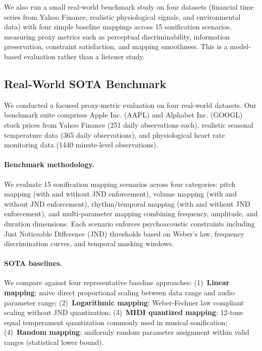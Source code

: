 \documentclass[sigchi, nonacm]{acmart}
\begin{document}
We also run a small real-world benchmark study on four datasets (financial time series from Yahoo Finance, realistic physiological signals, and environmental data) with four simple baseline mappings across 15 sonification scenarios, measuring proxy metrics such as perceptual discriminability, information preservation, constraint satisfaction, and mapping smoothness. This is a model-based evaluation rather than a listener study.

\subsection{Real-World SOTA Benchmark}
\label{sec:sota_benchmark}

We conducted a focused proxy-metric evaluation on four real-world datasets. Our benchmark suite comprises Apple Inc. (AAPL) and Alphabet Inc. (GOOGL) stock prices from Yahoo Finance (251 daily observations each), realistic seasonal temperature data (365 daily observations), and physiological heart rate monitoring data (1440 minute-level observations).

\paragraph{Benchmark methodology.} We evaluate 15 sonification mapping scenarios across four categories: pitch mapping (with and without JND enforcement), volume mapping (with and without JND enforcement), rhythm/temporal mapping (with and without JND enforcement), and multi-parameter mapping combining frequency, amplitude, and duration dimensions. Each scenario enforces psychoacoustic constraints including Just Noticeable Difference (JND) thresholds based on Weber's law, frequency discrimination curves, and temporal masking windows.

\paragraph{SOTA baselines.} We compare against four representative baseline approaches: (1)~\textbf{Linear mapping}: naive direct proportional scaling between data range and audio parameter range; (2)~\textbf{Logarithmic mapping}: Weber-Fechner law compliant scaling without JND quantization; (3)~\textbf{MIDI quantized mapping}: 12-tone equal temperament quantization commonly used in musical sonification; (4)~\textbf{Random mapping}: uniformly random parameter assignment within valid ranges (statistical lower bound).
\end{document}
